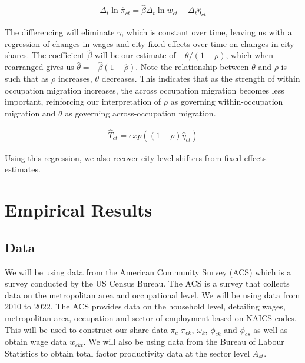 \documentclass[10pt]{article}
\begin{document}
\begin{align*}
    \Delta_t \ln \hat{\pi}_{ct} = \hat{\beta} \Delta_t \ln w_{ct} + \Delta_t \hat{\eta}_{ct}
\end{align*}

The differencing will eliminate $\gamma$, which is constant over time, leaving us with a regression of changes in wages and city fixed effects over time on changes in city shares. The coefficient $\hat{\beta}$ will be our estimate of $ - \theta / (1 - \rho)$, which when rearranged gives us $\hat{\theta} = - \hat{\beta} (1 - \hat{\rho})$. Note the relationship between $\theta$ and $\rho$ is such that as $\rho$ increases, $\theta$ decreases. This indicates that as the strength of within occupation migration increases, the across occupation migration becomes less important, reinforcing our interpretation of $\rho$ as governing within-occupation migration and $\theta$ as governing across-occupation migration.

\begin{align*}
    \hat{T}_{ct} = exp \left( (1 - \rho) \hat{\eta}_{ct} \right)
\end{align*}

Using this regression, we also recover city level shifters from fixed effects estimates.

\section{Empirical Results}

\subsection{Data}

We will be using data from the American Community Survey (ACS) which is a survey conducted by the US Census Bureau. The ACS is a survey that collects data on the metropolitan area and occupational level. We will be using data from 2010 to 2022. The ACS provides data on the household level, detailing wages, metropolitan area, occupation and sector of employment based on NAICS codes. This will be used to construct our share data $\pi_c$ $\pi_{ck}$, $\omega_k$, $\phi_{ck}$ and $\phi_{cs}$ as well as obtain wage data $w_{ckt}$. We will also be using data from the Bureau of Labour Statistics to obtain total factor productivity data at the sector level $A_{st}$.

\end{document}
